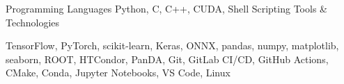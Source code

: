 

\begin{cvparagraph}

\begin{cvskills}
  \cvskill
    {Programming Languages}
    {Python, C, C++, CUDA, Shell Scripting}
  \cvskill
  {Tools \& Technologies}
  {\parbox[t]{0.75\textwidth}{
    TensorFlow, PyTorch, scikit-learn, Keras, ONNX, 
    pandas, numpy, matplotlib, seaborn, 
    ROOT, HTCondor, PanDA, 
    Git, GitLab CI/CD, GitHub Actions, 
    CMake, Conda, 
    Jupyter Notebooks, VS Code, Linux
  }}
\end{cvskills}

\end{cvparagraph}